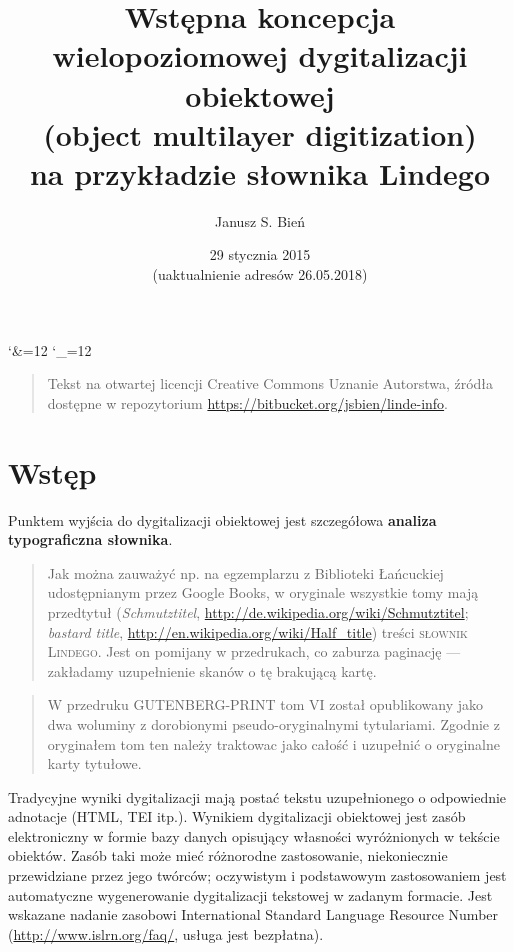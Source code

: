 \documentclass[12]{mwart}
\title{Wstępna koncepcja\\
  wielopoziomowej dygitalizacji obiektowej\\(object multilayer
  digitization)\\na przykładzie słownika Lindego}
\author{Janusz S. Bień}
\date{29 stycznia 2015\\(uaktualnienie adresów 26.05.2018)}
\begin{document}
\maketitle

\catcode`\&=12
\catcode`\_=12

\begin{quote}
  Tekst na otwartej licencji Creative Commons Uznanie Autorstwa,
  źródła dostępne w repozytorium
  \url{https://bitbucket.org/jsbien/linde-info}.

\end{quote}

\section{Wstęp}

Punktem wyjścia do dygitalizacji obiektowej jest szczegółowa
\textbf{analiza typograficzna słownika}.

\begin{quote}
  Jak można zauważyć np. na egzemplarzu z Biblioteki Łańcuckiej
  udostępnianym przez Google Books, w oryginale wszystkie tomy mają
  przedtytuł (\textit{Schmutztitel},
  \url{http://de.wikipedia.org/wiki/Schmutztitel}; \textit{bastard
    title}, \url{http://en.wikipedia.org/wiki/Half_title}) treści
  \textsc{słownik Lindego}. Jest on pomijany w przedrukach, co zaburza
  paginację --- zakładamy uzupełnienie skanów o tę brakującą kartę.
\end{quote}

\begin{quote}
  W przedruku GUTENBERG-PRINT tom VI został opublikowany jako dwa
  woluminy z dorobionymi pseudo-oryginalnymi tytulariami. Zgodnie z
  oryginałem tom ten należy traktowac jako całość i uzupełnić o
  oryginalne karty tytułowe.
\end{quote}



Tradycyjne wyniki dygitalizacji mają postać tekstu uzupełnionego o
odpowiednie adnotacje (HTML, TEI itp.). Wynikiem dygitalizacji
obiektowej jest zasób elektroniczny w formie bazy danych opisujący
własności wyróżnionych w tekście obiektów. Zasób taki może mieć
różnorodne zastosowanie, niekoniecznie przewidziane przez jego
twórców; oczywistym i podstawowym zastosowaniem jest automatyczne
wygenerowanie dygitalizacji tekstowej w zadanym formacie. Jest
wskazane nadanie zasobowi International Standard Language Resource
Number (\url{http://www.islrn.org/faq/}, usługa jest bezpłatna).
\end{document}

